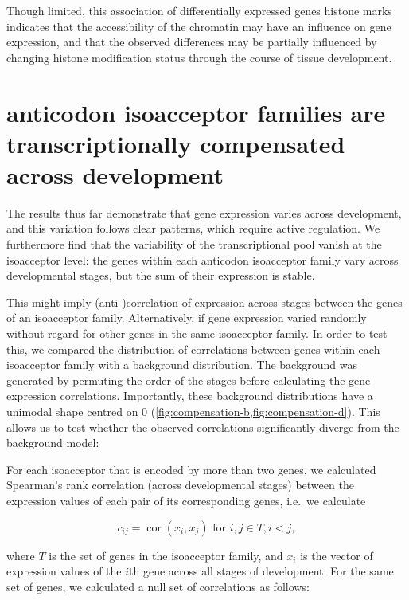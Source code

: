 Though limited, this association of differentially expressed \trna genes histone
marks indicates that the accessibility of the chromatin may have an influence on
\trna gene expression, and that the observed differences may be partially
influenced by changing histone modification status through the course of tissue
development.

\section{\trna anticodon isoacceptor families are transcriptionally compensated
across development}

The results thus far demonstrate that \trna gene expression varies across
development, and this variation follows clear patterns, which require active
regulation. We furthermore find that the variability of the transcriptional
\trna pool vanish at the isoacceptor level: the \trna genes within each
anticodon isoacceptor family vary across developmental stages, but the sum of
their expression is stable.

This might imply (anti-)correlation of expression across stages between the
genes of an isoacceptor family. Alternatively, if \trna gene expression varied
randomly without regard for other \trna genes in the same isoacceptor family. In
order to test this, we compared the distribution of correlations between genes
within each isoacceptor family with a background distribution. The
background was generated by permuting the order of the stages before calculating
the \trna gene expression correlations. Importantly, these background
distributions have a unimodal shape centred on \num{0}
(\cref{fig:compensation-b,fig:compensation-d}). This allows us to test whether
the observed correlations significantly diverge from the background model:

For each isoacceptor that is encoded by more than two \trna genes, we calculated
Spearman’s rank correlation (across developmental stages) between the expression
values of each pair of its corresponding \trna genes, i.e.\ we calculate

\begin{equation}
    c_{ij} = \operatorname{cor}(x_i, x_j) \text{\ for \(i, j \in T, i < j\)},
\end{equation}

where \(T\) is the set of \trna genes in the isoacceptor family, and \(x_i\) is
the vector of expression values of the \(i\)th \trna gene across all stages of
development. For the same set of genes, we calculated a null set of correlations
as follows:

